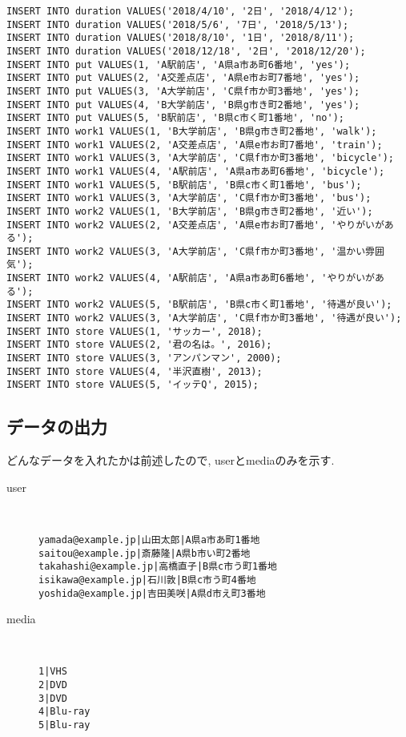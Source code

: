 \documentclass{jarticle}
\begin{document}
\begin{verbatim}
INSERT INTO duration VALUES('2018/4/10', '2日', '2018/4/12');
INSERT INTO duration VALUES('2018/5/6', '7日', '2018/5/13');
INSERT INTO duration VALUES('2018/8/10', '1日', '2018/8/11');
INSERT INTO duration VALUES('2018/12/18', '2日', '2018/12/20');
INSERT INTO put VALUES(1, 'A駅前店', 'A県a市あ町6番地', 'yes');
INSERT INTO put VALUES(2, 'A交差点店', 'A県e市お町7番地', 'yes');
INSERT INTO put VALUES(3, 'A大学前店', 'C県f市か町3番地', 'yes');
INSERT INTO put VALUES(4, 'B大学前店', 'B県g市き町2番地', 'yes');
INSERT INTO put VALUES(5, 'B駅前店', 'B県c市く町1番地', 'no');
INSERT INTO work1 VALUES(1, 'B大学前店', 'B県g市き町2番地', 'walk');
INSERT INTO work1 VALUES(2, 'A交差点店', 'A県e市お町7番地', 'train');
INSERT INTO work1 VALUES(3, 'A大学前店', 'C県f市か町3番地', 'bicycle');
INSERT INTO work1 VALUES(4, 'A駅前店', 'A県a市あ町6番地', 'bicycle');
INSERT INTO work1 VALUES(5, 'B駅前店', 'B県c市く町1番地', 'bus');
INSERT INTO work1 VALUES(3, 'A大学前店', 'C県f市か町3番地', 'bus');
INSERT INTO work2 VALUES(1, 'B大学前店', 'B県g市き町2番地', '近い');
INSERT INTO work2 VALUES(2, 'A交差点店', 'A県e市お町7番地', 'やりがいがある');
INSERT INTO work2 VALUES(3, 'A大学前店', 'C県f市か町3番地', '温かい雰囲気');
INSERT INTO work2 VALUES(4, 'A駅前店', 'A県a市あ町6番地', 'やりがいがある');
INSERT INTO work2 VALUES(5, 'B駅前店', 'B県c市く町1番地', '待遇が良い');
INSERT INTO work2 VALUES(3, 'A大学前店', 'C県f市か町3番地', '待遇が良い');
INSERT INTO store VALUES(1, 'サッカー', 2018);
INSERT INTO store VALUES(2, '君の名は。', 2016);
INSERT INTO store VALUES(3, 'アンパンマン', 2000);
INSERT INTO store VALUES(4, '半沢直樹', 2013);
INSERT INTO store VALUES(5, 'イッテQ', 2015);
\end{verbatim}
\subsection{データの出力}
どんなデータを入れたかは前述したので, userとmediaのみを示す.
\begin{description}
\item[user] \leavevmode \\
\begin{verbatim}
yamada@example.jp|山田太郎|A県a市あ町1番地
saitou@example.jp|斎藤隆|A県b市い町2番地
takahashi@example.jp|高橋直子|B県c市う町1番地
isikawa@example.jp|石川敦|B県c市う町4番地
yoshida@example.jp|吉田美咲|A県d市え町3番地
\end{verbatim}
\item[media] \leavevmode \\
\begin{verbatim}
1|VHS
2|DVD
3|DVD
4|Blu-ray
5|Blu-ray
\end{verbatim}
\end{description}
\end{document}
